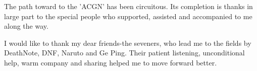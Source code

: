 \begin{acknowledgements}
\setlength{\parindent}{0pt}

The path toward to the 'ACGN' has been circuitous. Its completion is thanks in large part to the special people who supported, assisted and accompanied to me along the way.

I would like to thank my dear friends-the seveners, who lead me to the fields by DeathNote, DNF, Naruto and Ge Ping. Their patient listening, unconditional help, warm company and sharing helped me to move forward better.

\lipsum[1-3]

\clearpage
\end{acknowledgements}
